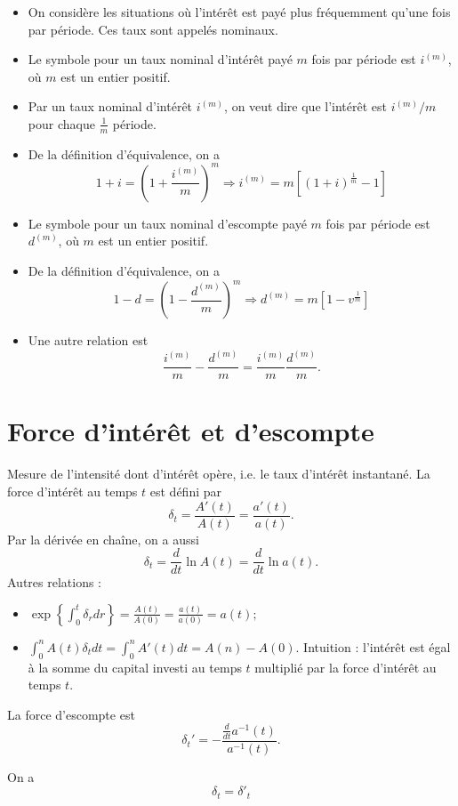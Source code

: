 \begin{itemize}
	\item On considère les situations où l'intérêt est payé plus fréquemment qu'une fois par période. Ces taux sont appelés nominaux.
	\item Le symbole pour un taux nominal d'intérêt payé $m$ fois par période est $i^{(m)}$, où $m$ est un entier positif. 
	\item Par un taux nominal d'intérêt $i^{(m)}$, on veut dire que l'intérêt est $i^{(m)}/m$ pour chaque $\frac{1}{m}$ période. 
	\item De la définition d'équivalence, on a 
	$$1 + i = \left(1 + \frac{i^{(m)}}{m}\right)^m \Rightarrow i^{(m)} = m\left[(1 + i)^{\frac{1}{m}} - 1\right]$$
	\item Le symbole pour un taux nominal d'escompte payé $m$ fois par période est $d^{(m)}$, où $m$ est un entier positif. 
	\item De la définition d'équivalence, on a 
	$$1 - d = \left(1 - \frac{d^{(m)}}{m}\right)^m \Rightarrow d^{(m)} = m\left[1 - v^{\frac{1}{m}}\right]$$
	\item Une autre relation est 
	$$\frac{i^{(m)}}{m} - \frac{d^{(m)}}{m} = \frac{i^{(m)}}{m} \frac{d^{(m)}}{m}.$$
\end{itemize}

\section{Force d'intérêt et d'escompte}

Mesure de l'intensité dont d'intérêt opère, i.e. le taux d'intérêt instantané. La force d'intérêt au temps $t$ est défini par $$\delta_t = \frac{A'(t)}{A(t)} = \frac{a'(t)}{a(t)}.$$
Par la dérivée en chaîne, on a aussi
$$\delta_t = \frac{d}{dt} \ln A(t) = \frac{d}{dt}\ln a(t).$$
Autres relations : 
\begin{itemize}
	\item $\displaystyle \exp\left\{\int_{0}^{t}\delta_r dr\right\} = \frac{A(t)}{A(0)} = \frac{a(t)}{a(0)} = a(t);$
	\item $\displaystyle \int_{0}^{n}A(t) \delta_t dt = \int_{0}^{n}A'(t) dt = A(n) - A(0).$ Intuition : l'intérêt est égal à la somme du capital investi au temps $t$ multiplié par la force d'intérêt au temps $t$.
\end{itemize}

La force d'escompte est 
$$\delta_t' = -\frac{\frac{d}{dt}a^{-1}(t)}{a^{-1}(t)}.$$

On a $$\delta_t = \delta'_t$$

